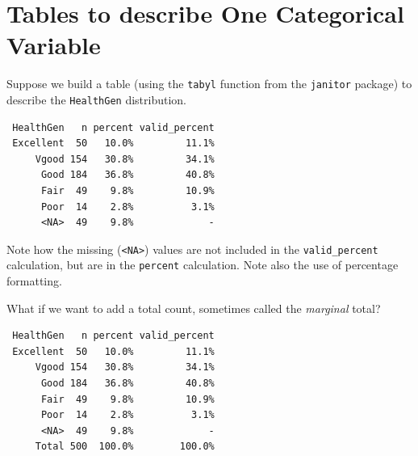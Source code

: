 \documentclass[
]{book}
\newenvironment{Shaded}{\begin{snugshade}}{\end{snugshade}}
\newcommand{\KeywordTok}[1]{\textcolor[rgb]{0.13,0.29,0.53}{\textbf{#1}}}
\newcommand{\NormalTok}[1]{#1}
\newcommand{\OperatorTok}[1]{\textcolor[rgb]{0.81,0.36,0.00}{\textbf{#1}}}
\newcommand{\StringTok}[1]{\textcolor[rgb]{0.31,0.60,0.02}{#1}}
\begin{document}
\hypertarget{tables-to-describe-one-categorical-variable}{%
\section{Tables to describe One Categorical Variable}\label{tables-to-describe-one-categorical-variable}}

Suppose we build a table (using the \texttt{tabyl} function from the \texttt{janitor} package) to describe the \texttt{HealthGen} distribution.

\begin{Shaded}
\end{Shaded}

\begin{verbatim}
 HealthGen   n percent valid_percent
 Excellent  50   10.0%         11.1%
     Vgood 154   30.8%         34.1%
      Good 184   36.8%         40.8%
      Fair  49    9.8%         10.9%
      Poor  14    2.8%          3.1%
      <NA>  49    9.8%             -
\end{verbatim}

Note how the missing (\texttt{\textless{}NA\textgreater{}}) values are not included in the \texttt{valid\_percent} calculation, but are in the \texttt{percent} calculation. Note also the use of percentage formatting.

What if we want to add a total count, sometimes called the \emph{marginal} total?

\begin{Shaded}
\end{Shaded}

\begin{verbatim}
 HealthGen   n percent valid_percent
 Excellent  50   10.0%         11.1%
     Vgood 154   30.8%         34.1%
      Good 184   36.8%         40.8%
      Fair  49    9.8%         10.9%
      Poor  14    2.8%          3.1%
      <NA>  49    9.8%             -
     Total 500  100.0%        100.0%
\end{verbatim}
\end{document}
